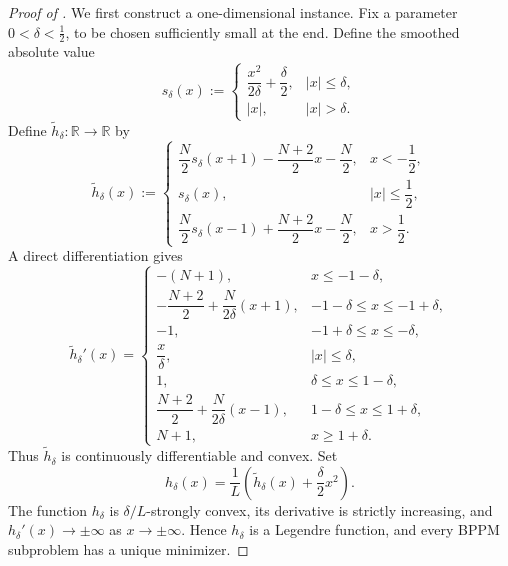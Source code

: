 \documentclass{article}
\theoremstyle{definition}
\theoremstyle{plain}
\newcommand{\reals}{\mathbb{R}}
\begin{document}
\begin{proof}[Proof of ]
We first construct a one-dimensional instance.
Fix a parameter $0<\delta<\frac12$, to be chosen sufficiently small at the end.
Define the smoothed absolute value
\[
    s_\delta(x)
    :=
    \begin{cases}
        \dfrac{x^2}{2\delta}+\dfrac{\delta}{2}, & |x|\le\delta,\\[0.6em]
        |x|, & |x|>\delta.
    \end{cases}
\]
Define $\widetilde h_\delta:\reals\to\reals$ by
\[
\widetilde h_\delta(x)
:=
\begin{cases}
\dfrac{N}{2}s_\delta(x+1)-\dfrac{N+2}{2}x-\dfrac{N}{2},
    & x<-\dfrac12,\\[0.8em]
s_\delta(x), & |x|\le\dfrac12,\\[0.8em]
\dfrac{N}{2}s_\delta(x-1)+\dfrac{N+2}{2}x-\dfrac{N}{2},
    & x>\dfrac12.
\end{cases}
\]
A direct differentiation gives
\begin{equation}
\widetilde h_\delta'(x)
=
\begin{cases}
-(N+1), & x\le -1-\delta,\\
-\dfrac{N+2}{2}+\dfrac{N}{2\delta}(x+1),
    & -1-\delta\le x\le -1+\delta,\\[0.4em]
-1, & -1+\delta\le x\le -\delta,\\
\dfrac{x}{\delta}, & |x|\le\delta,\\[0.4em]
1, & \delta\le x\le 1-\delta,\\
\dfrac{N+2}{2}+\dfrac{N}{2\delta}(x-1),
    & 1-\delta\le x\le 1+\delta,\\[0.4em]
N+1, & x\ge 1+\delta.
\end{cases}
    \label{eq:bppm-tight-h-tilde-derivative}
\end{equation}
Thus $\widetilde h_\delta$ is continuously differentiable and convex.
Set
\begin{equation}
    h_\delta(x)
    =
    \frac{1}{L}\left(\widetilde h_\delta(x)+\frac{\delta}{2}x^2\right).
    \label{eq:bppm-tight-h-def}
\end{equation}
The function $h_\delta$ is $\delta/L$-strongly convex, its derivative is strictly increasing, and $h_\delta'(x)\to\pm\infty$ as $x\to\pm\infty$.
Hence $h_\delta$ is a Legendre function, and every BPPM subproblem has a unique minimizer.


\end{proof}
\end{document}
